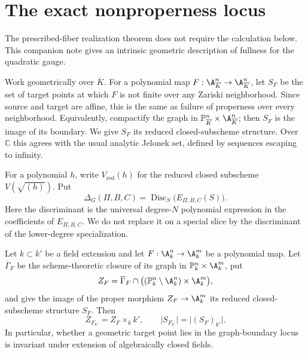 \section{The exact nonproperness locus}
\label{sec:nonproperness}

The prescribed-fiber realization theorem does not require the calculation
below.  This companion note gives an intrinsic geometric description of
fullness for the quadratic gauge.

Work geometrically over
\(\overline K\).  For a polynomial map \(F:\A^n_{\overline K}\to
\A^n_{\overline K}\), let \(S_F\) be the set of target points at which \(F\)
is not finite over any Zariski neighborhood.  Since source and target are
affine, this is the same as failure of properness over every neighborhood.
Equivalently, compactify the graph in
\(\mathbb P^n_{\overline K}\times\A^n_{\overline K}\); then \(S_F\) is the
image of its boundary.  We give \(S_F\) its reduced closed-subscheme
structure.  Over \(\mathbb C\) this agrees with the usual analytic Jelonek
set, defined by sequences escaping to infinity.

For a polynomial \(h\), write \(V_{\mathrm{red}}(h)\) for the reduced closed
subscheme \(V(\sqrt{(h)})\).  Put
\begin{equation}
 \Delta_G(\Pi,B,C)
 =\operatorname{Disc}_S\bigl(E_{\Pi,B,C}(S)\bigr).
 \label{eq:gauge-discriminant}
\end{equation}
Here the discriminant is the universal degree-\(N\) polynomial expression in
the coefficients of \(E_{\Pi,B,C}\).  We do not replace it on a special
slice by the discriminant of the lower-degree specialization.

\begin{lemma}
\label{lem:nonfinite-base-change}
Let \(k\subset k'\) be a field extension and let
\(F:\A^n_k\to\A^m_k\) be a polynomial map.  Let \(\overline\Gamma_F\) be
the scheme-theoretic closure of its graph in
\(\mathbb P^n_k\times\A^m_k\), put
\[
 Z_F=\overline\Gamma_F\cap
 \bigl((\mathbb P^n_k\setminus\A^n_k)\times\A^m_k\bigr),
\]
and give the image of the proper morphism \(Z_F\to\A^m_k\) its reduced
closed-subscheme structure \(S_F\).  Then
\[
 Z_{F_{k'}}=Z_F\times_k k',
 \qquad
 \lvert S_{F_{k'}}\rvert=\lvert (S_F)_{k'}\rvert .
\]
In particular, whether a geometric target point lies in the graph-boundary
locus is invariant under extension of algebraically closed fields.
\end{lemma}


